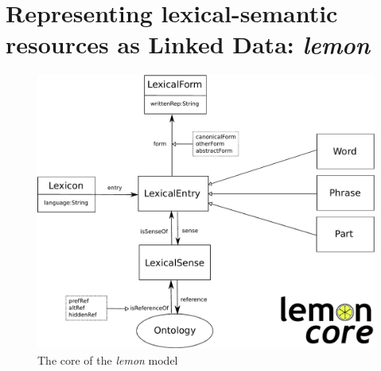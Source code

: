 \section{Representing lexical-semantic resources as Linked Data: \emph{lemon}}

\begin{figure}
 \begin{center}

 	 \includegraphics[width=1.0\columnwidth]{images/lemon-core}

 \end{center}
\caption{The core of the \emph{lemon} model\label{lemon-core}}
\end{figure}


